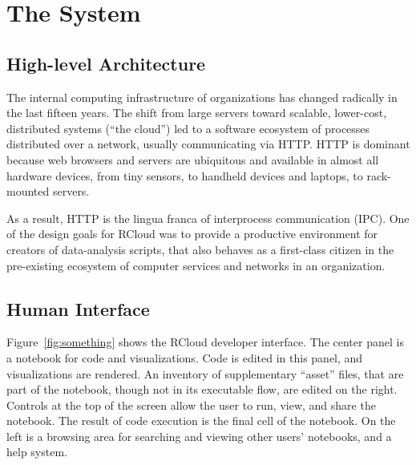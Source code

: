 \section{The System\label{sec:system}}

\subsection{High-level Architecture\label{sec:highlevelarchitecture}}


The internal computing infrastructure of organizations has changed
radically in the last fifteen years. The shift from large
servers toward scalable, lower-cost, distributed systems (``the cloud'')
led to a software ecosystem of processes distributed over a
network, usually communicating via HTTP. HTTP is dominant because
web browsers and servers are ubiquitous and available in almost
all hardware devices, from tiny sensors, to handheld devices and
laptops, to rack-mounted servers.

As a result, HTTP is the lingua franca of interprocess communication
(IPC). One of the design goals for RCloud was to provide a productive
environment for creators of data-analysis scripts, that also behaves
as a first-class citizen in the pre-existing ecosystem of computer
services and networks in an organization.


\subsection{Human Interface\label{sec:humaninterface}}


Figure~\ref{fig:something} shows the RCloud developer interface.
The center panel is a notebook for code and visualizations.
Code is edited in this panel, and visualizations are rendered.
An inventory of supplementary ``asset'' files, that are part of
the notebook, though not in its executable flow, are edited on the right.
Controls at the top of the screen allow the user to run, view, and
share the notebook. The result of code execution is the final cell of
the notebook.  On the left is a browsing area for searching and viewing
other users' notebooks, and a help system.

